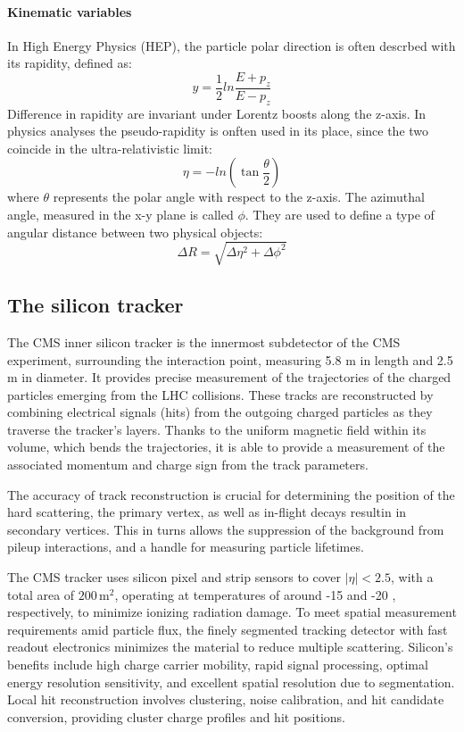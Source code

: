 \paragraph{Kinematic variables\\}
In High Energy Physics (HEP), the particle polar direction is often descrbed with its rapidity, defined as:
\begin{equation}
  \label{eq:rapidityDefinition}
  y = \frac{1}{2} ln \frac{E + p_z}{E - p_z}
\end{equation}
Difference in rapidity are invariant under Lorentz boosts along the z-axis.
In physics analyses the pseudo-rapidity is onften used in its place, since the two coincide in the ultra-relativistic limit:
\begin{equation}
  \label{eq:pseudorapidityDefinition}
  \eta = - ln \left( \tan \frac{\theta}{2} \right)
\end{equation}
where $\theta$ represents the polar angle with respect to the z-axis. The azimuthal angle, measured in the x-y plane is called $\phi$.
They are used to define a type of angular distance between two physical objects:
\begin{equation}
  \label{eq:deltaRDefinition}
  \Delta R = \sqrt{ \Delta \eta^2 + \Delta \phi^2 }
\end{equation}

\subsection{The silicon tracker}
The CMS inner silicon tracker is the innermost subdetector of the CMS experiment, surrounding the interaction point, measuring 5.8 m in length and 2.5 m in diameter.
It provides precise measurement of the trajectories of the charged particles emerging from the LHC collisions.
These tracks are reconstructed by combining electrical signals (hits) from the outgoing charged particles as they traverse the tracker's layers.
Thanks to the uniform magnetic field within its volume, which bends the trajectories, it is able to provide a measurement of the associated momentum and charge sign from the track parameters.

The accuracy of track reconstruction is crucial for determining the position of the hard scattering, the primary vertex, as well as in-flight decays resultin in secondary vertices.
This in turns allows the suppression of the background from pileup interactions, and a handle for measuring particle lifetimes.

The CMS tracker uses silicon pixel and strip sensors to cover $|\eta| < 2.5$, with a total area of $200\, \mathrm{m}^2$,
operating at temperatures of around -15 \Celsius and -20 \Celsius, respectively, to minimize ionizing radiation damage.
To meet spatial measurement requirements amid particle flux, the finely segmented tracking detector with fast readout electronics minimizes the material to reduce multiple scattering.
Silicon's benefits include high charge carrier mobility, rapid signal processing, optimal energy resolution sensitivity, and excellent spatial resolution due to segmentation.
Local hit reconstruction involves clustering, noise calibration, and hit candidate conversion, providing cluster charge profiles and hit positions.


